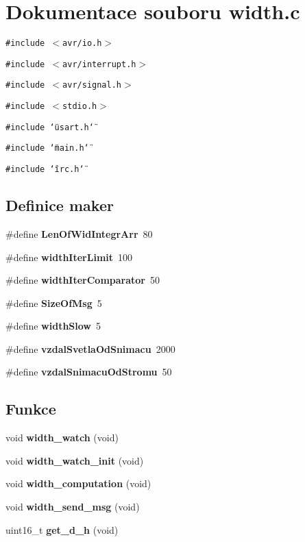 \section{Dokumentace souboru width.c}
\label{width_8c}
{\tt \#include $<$avr/io.h$>$}\par
{\tt \#include $<$avr/interrupt.h$>$}\par
{\tt \#include $<$avr/signal.h$>$}\par
{\tt \#include $<$stdio.h$>$}\par
{\tt \#include \char`\"{}usart.h\char`\"{}}\par
{\tt \#include \char`\"{}main.h\char`\"{}}\par
{\tt \#include \char`\"{}irc.h\char`\"{}}\par
\subsection*{Definice maker}
\begin{CompactItemize}
\item 
\#define {\bf LenOfWidIntegrArr}~80
\item 
\#define {\bf widthIterLimit}~100
\item 
\#define {\bf widthIterComparator}~50
\item 
\#define {\bf SizeOfMsg}~5
\item 
\#define {\bf widthSlow}~5
\item 
\#define {\bf vzdalSvetlaOdSnimacu}~2000
\item 
\#define {\bf vzdalSnimacuOdStromu}~50
\end{CompactItemize}
\subsection*{Funkce}
\begin{CompactItemize}
\item 
void {\bf width\_\-watch} (void)
\item 
void {\bf width\_\-watch\_\-init} (void)
\item 
void {\bf width\_\-computation} (void)
\item 
void {\bf width\_\-send\_\-msg} (void)
\item 
uint16\_\-t {\bf get\_\-d\_\-h} (void)
\end{CompactItemize}
